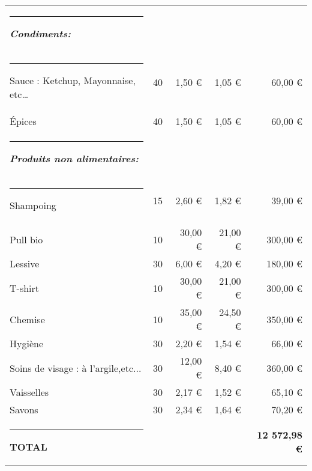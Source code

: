 \documentclass[12pt,a4paper]{report}
\begin{document}
\begin{table}[h]
\begin{tabular}{lrrrr}
					\rule[0.5cm]{-0.1cm}{0cm}
					\textbf{\textit{\color{green}Condiments: }}  &       &       &  &   \\
					\rule[0.5cm]{-0.1cm}{0cm}
					Sauce : Ketchup, Mayonnaise, etc… & 40    &                                    1,50 €  &                         1,05 €  &                                 60,00 €  \\
					Épices  & 40    &                                    1,50 €  &                         1,05 €  &                                 60,00 €  \\
					\rule[0.5cm]{-0.1cm}{0cm}
				\textbf{\textit{\color{green}Produits non alimentaires:}}  &       &       &  &     \\
					\rule[0.5cm]{-0.1cm}{0cm}
					Shampoing  & 15    &                                    2,60 €  &                         1,82 €  &                                 39,00 €  \\
					Pull bio  & 10    &                                 30,00 €  &                       21,00 €  &                               300,00 €  \\
					Lessive  & 30    &                                    6,00 €  &                         4,20 €  &                               180,00 €  \\
					T-shirt  & 10    &                                 30,00 €  &                       21,00 €  &                               300,00 €  \\
					Chemise  & 10    &                                 35,00 €  &                       24,50 €  &                               350,00 €  \\
					Hygiène  & 30    &                                    2,20 €  &                         1,54 €  &                                 66,00 €  \\
					Soins de visage : à l'argile,etc... & 30    &                                 12,00 €  &                         8,40 €  &                               360,00 €  \\
					 Vaisselles & 30    &                                    2,17 €  &                         1,52 €  &                                 65,10 €  \\
					Savons  & 30    &                                    2,34 €  &                         1,64 €  &                                 70,20 €  \\
					\rule[0.5cm]{-0.1cm}{0cm}
					\textbf{\color{green}TOTAL}	&       &       &       & \textbf{\color{green}12 572,98 € } \\
					
				\end{tabular}%
				\label{tab:addlabel}%
			\end{table}%
			
\end{document}
